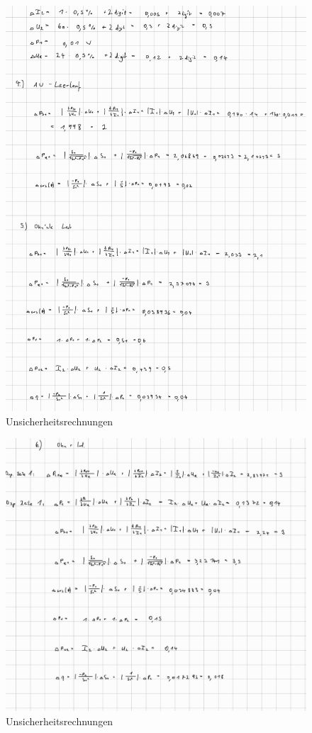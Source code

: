 \documentclass[12pt,a4paper,twoside]{article}
\begin{document}
\begin{figure}[H]
    \centering
    \includegraphics[width=0.8\linewidth, angle=0]{nudes/Unsicherheiten2.jpg}
    \caption{Unsicherheitsrechnungen}
    \label{fig:Unsicherheitsrechnungen2}
\end{figure}

\begin{figure}[H]
    \centering
    \includegraphics[width=0.8\linewidth, angle=0]{nudes/Unsicherheiten3.jpg}
    \caption{Unsicherheitsrechnungen}
    \label{fig:Unsicherheitsrechnungen3}
\end{figure}


\printbibliography[heading=bibintoc]
\end{document}
